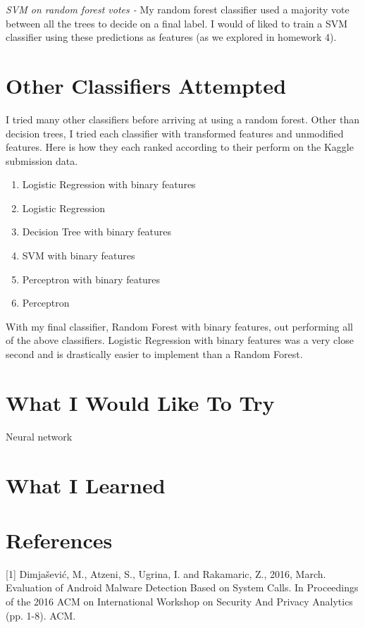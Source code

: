 \documentclass[a4paper, 11pt]{article} %
\begin{document}
\bigbreak
\noindent
\textit{SVM on random forest votes - } My random forest classifier used a majority vote between all the trees to decide on a final label. I would of liked to train a SVM classifier using these predictions as features (as we explored in homework 4).

\section*{Other Classifiers Attempted}

I tried many other classifiers before arriving at using a random forest. Other than decision trees, I tried each classifier with transformed features and unmodified features. Here is how they each ranked according to their perform on the Kaggle submission data. 

\begin{enumerate}
	\item Logistic Regression with binary features
	\item Logistic Regression
	\item Decision Tree with binary features
	\item SVM with binary features
	\item Perceptron with binary features
	\item Perceptron
\end{enumerate}

With my final classifier, Random Forest with binary features, out performing all of the above classifiers. Logistic Regression with binary features was a very close second and is drastically easier to implement than a Random Forest.

\section*{What I Would Like To Try}

Neural network

\section*{What I Learned}

\section*{References}
[1] Dimja\v{s}evi\'{c}, M., Atzeni, S., Ugrina, I. and Rakamaric, Z., 2016, March. Evaluation of Android Malware Detection Based on System Calls. In Proceedings of the 2016 ACM on International Workshop on Security And Privacy Analytics (pp. 1-8). ACM.
\end{document}
